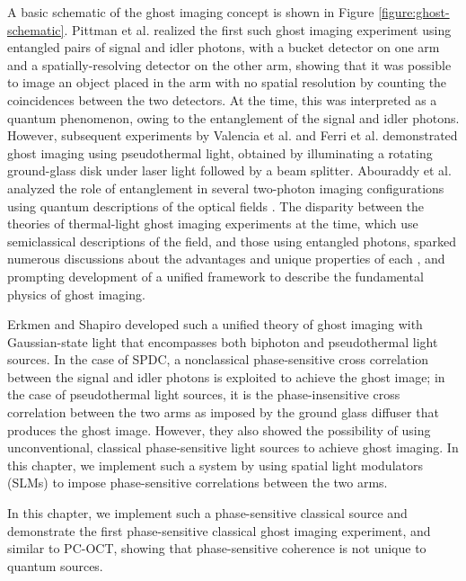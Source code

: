 A basic schematic of the ghost imaging concept is shown in Figure \ref{figure:ghost-schematic}. Pittman et al. realized the first such ghost imaging experiment \cite{pittman-ghost} using entangled pairs of signal and idler photons, with a bucket detector on one arm and a spatially-resolving detector on the other arm, showing that it was possible to image an object placed in the arm with no spatial resolution by counting the coincidences between the two detectors. At the time, this was interpreted as a quantum phenomenon, owing to the entanglement of the signal and idler photons. However, subsequent experiments by Valencia et al. \cite{valencia-two} and Ferri et al. \cite{ferri-high} demonstrated ghost imaging using pseudothermal light, obtained by illuminating a rotating ground-glass disk under laser light followed by a beam splitter. Abouraddy et al. analyzed the role of entanglement in several two-photon imaging configurations using quantum descriptions of the optical fields \cite{abouraddy-role,abouraddy-fourier}. The disparity between the theories of thermal-light ghost imaging experiments at the time, which use semiclassical descriptions of the field, and those using entangled photons, sparked numerous discussions about the advantages and unique properties of each \cite{dangelo-identifying,bennink-quantum,gatti-entangled}, and prompting development of a unified framework to describe the fundamental physics of ghost imaging.

Erkmen and Shapiro developed such a unified theory of ghost imaging with Gaussian-state light \cite{erkmen-unified} that encompasses both biphoton and pseudothermal light sources. In the case of SPDC, a nonclassical phase-sensitive cross correlation between the signal and idler photons is exploited to achieve the ghost image; in the case of pseudothermal light sources, it is the phase-insensitive cross correlation between the two arms as imposed by the ground glass diffuser that produces the ghost image. However, they also showed the possibility of using unconventional, classical phase-sensitive light sources to achieve ghost imaging. In this chapter, we implement such a system by using spatial light modulators (SLMs) to impose phase-sensitive correlations between the two arms.

In this chapter, we implement such a phase-sensitive classical source and demonstrate the first phase-sensitive classical ghost imaging experiment, and similar to PC-OCT, showing that phase-sensitive coherence is not unique to quantum sources.

